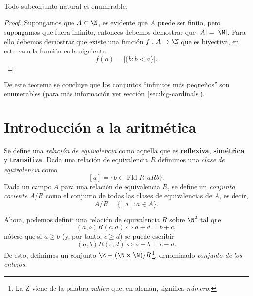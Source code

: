 \documentclass[11pt,oneside,a4paper]{book}
\DeclareMathOperator{\Fld}{Fld}
\begin{document}
\begin{thm}
Todo subconjunto natural es enumerable.
\end{thm}
\begin{proof}
Supongamos que $A\subset\N$, es evidente que $A$ puede ser finito, pero supongamos que fuera infinito, entonces debemos demostrar que $|A|=|\N|$. Para ello debemos demostrar que existe una función $f:A\rightarrow\N$ que es biyectiva, en este caso la función es la siguiente
$$f(a)=|\{b:b\lt a\}|.$$
\end{proof}
De este teorema se concluye que los conjuntos ``infinitos más pequeños'' son enumerables (para más información ver sección~\ref{sec:big-cardinals}).

\section{Introducción a la aritmética}
\begin{mydef}
Se define una \textit{relación de equivalencia} como aquella que es \textbf{reflexiva}, \textbf{simétrica} y \textbf{transitiva}. Dada una relación de equivalencia $R$ definimos una \textit{clase de equivalencia} como
$$[a]=\{b\in\Fld R:aRb\}.$$
Dado un campo $A$ para una relación de equivalencia $R$, se define un \textit{conjunto cociente} $A/R$ como el conjunto de todas las clases de equivalencias de $A$, es decir,
$$A/R=\{[a]:a\in A\}.$$
\end{mydef}
Ahora, podemos definir una relación de equivalencia $R$ sobre $\N^2$ tal que
$$(a,b)R(c,d)\iff a+d=b+c,$$
nótese que si $a\geq b$ (y, por tanto, $c\geq d$) se puede escribir
$$(a,b)R(c,d)\iff a-b=c-d.$$
De esto, definimos un conjunto $\Z\equiv(\N\times\N)/R$\footnote{La Z viene de la palabra \textit{zahlen} que, en alemán, significa \textit{número}.}, denominado \textit{conjunto de los enteros}.
\end{document}
